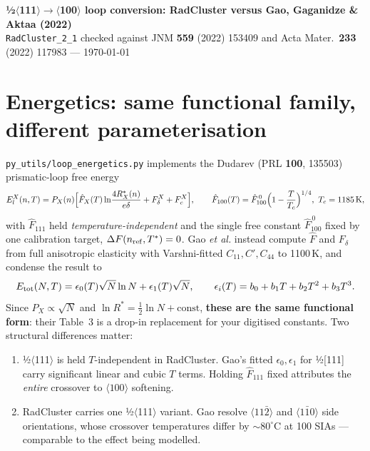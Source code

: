 \documentclass[11pt,a4paper]{article}
\newcommand{\code}[1]{\texttt{\small #1}}
\newcommand{\flag}[1]{\textcolor{red!70!black}{#1}}
\begin{document}
\begin{center}
{\large\bfseries ½$\langle$111$\rangle\rightarrow\langle$100$\rangle$ loop conversion:
RadCluster versus Gao, Gaganidze \& Aktaa (2022)}\\[2pt]
{\footnotesize \code{RadCluster\_2\_1} checked against JNM \textbf{559} (2022) 153409 and
Acta Mater.\ \textbf{233} (2022) 117983 --- \today}
\end{center}
\vspace{2pt}

\section{Energetics: same functional family, different parameterisation}

\code{py\_utils/loop\_energetics.py} implements the Dudarev (PRL \textbf{100}, 135503)
prismatic-loop free energy
\[
E^X_l(n,T)=P_X(n)\Bigl[\hat F_X(T)\ln\!\frac{4R^*_X(n)}{e\delta}+F^X_\delta+F^X_c\Bigr],
\qquad
\hat F_{100}(T)=\hat F^{\,0}_{100}\Bigl(1-\frac{T}{T_c}\Bigr)^{1/4},\ T_c=1185\,\mathrm{K},
\]
with $\hat F_{111}$ held \emph{temperature-independent} and the single free constant
$\hat F^{\,0}_{100}$ fixed by one calibration target, $\Delta F(n_{\rm ref},T^*)=0$.
Gao \emph{et al.} instead compute $\hat F$ and $F_\delta$ from full anisotropic
elasticity with Varshni-fitted $C_{11},C',C_{44}$ to 1100\,K, and condense the result to
\[
E_{\rm tot}(N,T)=\epsilon_0(T)\sqrt N\ln N+\epsilon_1(T)\sqrt N,\qquad
\epsilon_i(T)=b_0+b_1T+b_2T^2+b_3T^3 .
\]
Since $P_X\propto\sqrt N$ and $\ln R^*=\tfrac12\ln N+\text{const}$, \textbf{these are the same
functional form}: their Table~3 is a drop-in replacement for your digitised constants.
Two structural differences matter:

\begin{enumerate}[leftmargin=*,itemsep=1pt,topsep=2pt]
\item \flag{½$\langle$111$\rangle$ is held $T$-independent in RadCluster.} Gao's fitted
$\epsilon_0,\epsilon_1$ for ½[111] carry significant linear and cubic $T$ terms. Holding
$\hat F_{111}$ fixed attributes the \emph{entire} crossover to $\langle100\rangle$ softening.
\item RadCluster carries one ½$\langle$111$\rangle$ variant. Gao resolve
$\langle11\bar2\rangle$ and $\langle1\bar10\rangle$ side orientations, whose crossover
temperatures differ by $\sim\!80^\circ$C at 100 SIAs --- comparable to the effect being modelled.
\end{enumerate}
\end{document}
